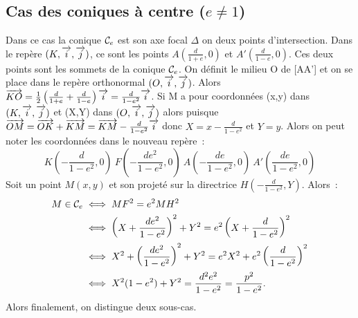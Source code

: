\subsection{Cas des coniques à centre (\(e\neq 1\))}
Dans ce cas la conique \(\mathcal{C}_{e}\) est son axe focal \(\Delta\) on deux points d'intersection. Dans le repère \((K,\overrightarrow{i},\overrightarrow{j})\), ce sont les points \(A(\frac{d}{1+e},0)\) et \(A'(\frac{d}{1-e},0)\). Ces deux points sont les sommets de la conique \(\mathcal{C}_{e}\). On définit le milieu O de [AA'] et on se place dans le repère orthonormal \((O,\overrightarrow{i},\overrightarrow{j})\). Alors \(\overrightarrow{KO}=\frac{1}{2}\left(\frac{d}{1+e}+\frac{d}{1-e}\right)\overrightarrow{i}=\frac{d}{1-e^2}\overrightarrow{i}\). Si M a pour coordonnées (x,y) dans \((K,\overrightarrow{i},\overrightarrow{j})\) et (X,Y) dans \((O,\overrightarrow{i},\overrightarrow{j})\) alors puisque \(\overrightarrow{OM}=\overrightarrow{OK}+\overrightarrow{KM}=\overrightarrow{KM}-\frac{d}{1-e^2}\overrightarrow{i}\) donc \(X=x-\frac{d}{1-e^2}\) et \(Y=y\). Alors on peut noter les coordonnées dans le nouveau repère~:
\begin{equation}
  K\left(-\frac{d}{1-e^2},0\right) \ F\left(-\frac{de^2}{1-e^2},0\right) \ A\left(-\frac{de}{1-e^2},0\right) \ A'\left(\frac{de}{1-e^2},0\right)
\end{equation}
Soit un point \(M(x,y)\) et son projeté sur la directrice \(H\left(-\frac{d}{1-e^2},Y\right)\). Alors~:
\begin{align}
  M \in \mathcal{C}_{e} &\iff MF^2=e^2 MH^2\\
  &\iff \left(X+\frac{de^2}{1-e^2}\right)^2+Y^2=e^2 \left(X+\frac{d}{1-e^2}\right)^2\\
  &\iff X^2+\left(\frac{de^2}{1-e^2}\right)^2+Y^2=e^2 X^2+e^2\left(\frac{d}{1-e^2}\right)^2\\
&\iff X^2(1-e^2)+Y^2=\frac{d^2e^2}{1-e^2}=\frac{p^2}{1-e^2}.
\end{align}
Alors finalement, on distingue deux sous-cas.

